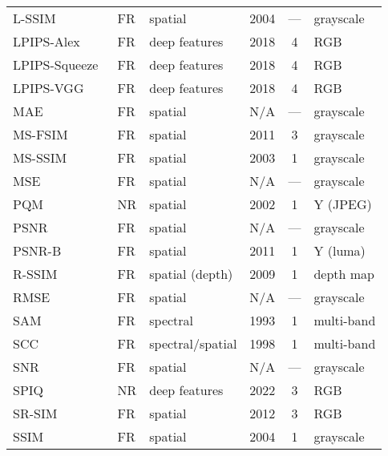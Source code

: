 \begin{longtable}{l l l c c l}
    L-SSIM~\cite{Wang2004SSIM}             & FR   & spatial             & 2004 & ---  & grayscale \\
    LPIPS-Alex~\cite{Zhang2018LPIPS}       & FR   & deep features       & 2018 & 4    & RGB \\
    LPIPS-Squeeze~\cite{Zhang2018LPIPS}    & FR   & deep features       & 2018 & 4    & RGB \\
    LPIPS-VGG~\cite{Zhang2018LPIPS}        & FR   & deep features       & 2018 & 4    & RGB \\
    MAE~\cite{Gonzalez2008DIP}             & FR   & spatial             & N/A  & ---  & grayscale \\
    MS-FSIM~\cite{Zhang2011FSIM}           & FR   & spatial             & 2011 & 3    & grayscale \\
    MS-SSIM~\cite{Wang2003MSSSIM}          & FR   & spatial             & 2003 & 1    & grayscale \\
    MSE~\cite{Gonzalez2008DIP}             & FR   & spatial             & N/A  & ---  & grayscale \\
    PQM~\cite{Wang2002PQM}                 & NR   & spatial             & 2002 & 1    & Y (JPEG) \\
    PSNR~\cite{Gonzalez2008DIP}            & FR   & spatial             & N/A  & ---  & grayscale \\
    PSNR-B~\cite{Yim2011PSNRB}             & FR   & spatial             & 2011 & 1    & Y (luma) \\
    R-SSIM~\cite{Malpica2008RSSIM}         & FR   & spatial (depth)     & 2009 & 1    & depth map \\
    RMSE~\cite{Gonzalez2008DIP}            & FR   & spatial             & N/A  & ---  & grayscale \\
    SAM~\cite{Kruse1993SAM}                & FR   & spectral            & 1993 & 1    & multi-band \\
    SCC~\cite{Zhou1998SCC}                 & FR   & spectral/spatial    & 1998 & 1    & multi-band \\
    SNR~\cite{Gonzalez2008DIP}             & FR   & spatial             & N/A  & ---  & grayscale \\
    SPIQ~\cite{Chen2022SPIQ}               & NR   & deep features       & 2022 & 3    & RGB \\
    SR-SIM~\cite{Zhang2012SRSIM}           & FR   & spatial             & 2012 & 3    & RGB \\
    SSIM~\cite{Wang2004SSIM}               & FR   & spatial             & 2004 & 1    & grayscale \\

\end{longtable}
